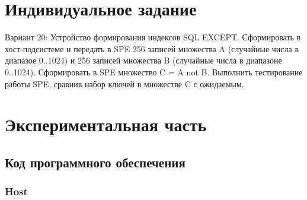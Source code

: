 \chapter{Индивидуальное задание}

Вариант 20: 
Устройство формирования индексов SQL EXCEPT. Сформировать в хост-подсистеме и передать в SPE 256 записей множества A (случайные числа в диапазое 0..1024) и 256 записей множества B (случайные числа в диапазоне 0..1024). Сформировать в SPE множество C = A not B. Выполнить тестирование работы SPE, сравнив набор ключей в множестве C с ожидаемым.

\chapter{Экспериментальная часть}




\section{Код программного обеспечения}

\subsection{Host}

